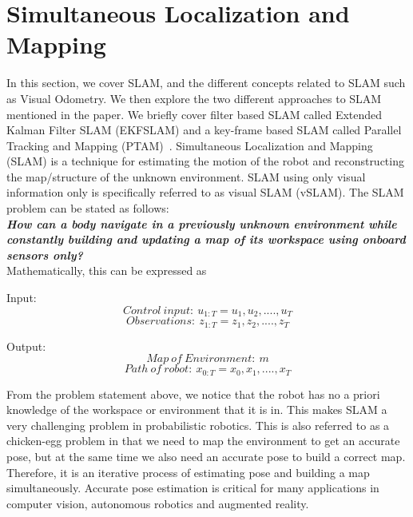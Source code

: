 \section{Simultaneous Localization and Mapping}
\label{slam}

In this section, we cover SLAM, and the different concepts related to SLAM such as Visual Odometry. We then explore the two different approaches to SLAM mentioned in the paper. We briefly cover filter based SLAM called Extended Kalman Filter SLAM (EKFSLAM) and a key-frame based SLAM called Parallel Tracking and Mapping (PTAM)~\cite{klein2007parallel}. Simultaneous Localization and Mapping (SLAM) is a technique for estimating the motion of the robot and reconstructing the map/structure of the unknown environment. SLAM using only visual information only is specifically referred to as visual SLAM (vSLAM). The SLAM problem can be stated as follows:\\

\textbf{\emph{How can a body navigate in a previously unknown environment while constantly building and updating a map of its workspace using onboard sensors only?} ~\cite{chli2017}}\\

Mathematically, this can be expressed as~\cite{cyrillslam}

Input:\
\begin{equation}
Control\ input:\ u_{1:T} = {u_1, u_2, ...., u_T}
\end{equation}
\begin{equation}
Observations:\ z_{1:T} = {z_1, z_2, ...., z_T}
\end{equation}

Output:\
\begin{equation}
Map\ of\ Environment:\ m
\end{equation}
\begin{equation}
Path\ of\ robot:\ x_{0:T} = {x_0, x_1, ...., x_T}
\end{equation}

From the problem statement above, we notice that the robot has no a priori knowledge of the workspace or environment that it is in. This makes SLAM a very challenging problem in probabilistic robotics. This is also referred to as a chicken-egg problem in that we need to map the environment to get an accurate pose, but at the same time we also need an accurate pose to build a correct map. Therefore, it is an iterative process of estimating pose and building a map simultaneously. Accurate pose estimation is critical for many applications in computer vision, autonomous robotics and augmented reality.
  

